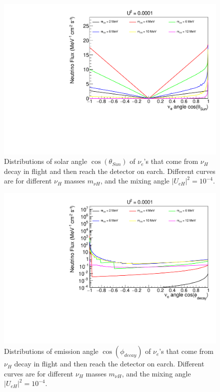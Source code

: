 \documentclass[%
 reprint,
 amsmath,amssymb,
 aps,
 prd,
twocolumn,
]{revtex4-1}
\begin{document}
\begin{figure}[!ht]
\includegraphics[width=0.99\columnwidth]{../plots/DecayInFlightNuLCosthetaSun_U0.0001_AllMass_linXlinY.pdf}
\caption{Distributions of solar angle $\cos(\theta_{Sun})$ of $\nu_e$'s that come from $\nu_H$ decay in flight and then reach the detector on earch. Different curves are for different $\nu_H$ masses $m_{\nu H}$, and the mixing angle $|U_{eH}|^2 = 10^{-4}$.}
\label{fig:DecayInFlightTheta_U1em4_AllMass}
\end{figure}

\begin{figure}[!ht]
\includegraphics[width=0.99\columnwidth]{../plots/DecayInFlightNuLCosphiSun_U0.0001_AllMass_linXlogY.pdf}
\caption{Distributions of emission angle $\cos(\phi_{decay})$ of $\nu_e$'s that come from $\nu_H$ decay in flight and then reach the detector on earch. Different curves are for different $\nu_H$ masses $m_{\nu H}$, and the mixing angle $|U_{eH}|^2 = 10^{-4}$.}
\label{fig:DecayInFlightPhi_U1em4_AllMass}
\end{figure}
\end{document}
